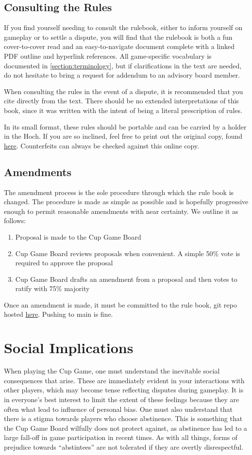 \documentclass[12pt]{IEEEconf}
\begin{document}
\subsection{Consulting the Rules}
If you find yourself needing to consult the rulebook, either to inform yourself on gameplay or to settle a dispute, you will find that the rulebook is both a fun cover-to-cover read and an easy-to-navigate document complete with a linked PDF outline and hyperlink references. All game-specific vocabulary is documented in \ref{section:terminology}, but if clarifications in the text are needed, do not hesitate to bring a request for addendum to an advisory board member.

When consulting the rules in the event of a dispute, it is recommended that you cite directly from the text. There should be no extended interpretations of this book, since it was written with the intent of being a literal prescription of rules.

In its small format, these rules should be portable and can be carried by a holder in the Hoch. If you are so inclined, feel free to print out the original copy, found \href{https://www.cs.hmc.edu/~hpick/Cupgame%20Rules.pdf}{here}. Counterfeits can always be checked against this online copy.
\subsection{Amendments}
The amendment process is the sole procedure through which the rule book is changed. The procedure is made as simple as possible and is hopefully progressive enough to permit reasonable amendments with near certainty. We outline it as follows:
\begin{enumerate}
    \item Proposal is made to the Cup Game Board
    \item Cup Game Board reviews proposals when convenient. A simple 50\% vote is required to approve the proposal
    \item Cup Game Board drafts an amendment from a proposal and then votes to ratify with 75\% majority
\end{enumerate}
Once an amendment is made, it must be committed to the rule book, git repo hosted \href{https://github.com/henry-2025/Cupgame-Rules}{here}. Pushing to main is fine.
\section{Social Implications}
\label{section:social}
When playing the Cup Game, one must understand the inevitable social consequences that arise. These are immediately evident in your interactions with other players, which may become tense reflecting disputes during gameplay. It is in everyone's best interest to limit the extent of these feelings because they are often what lead to influence of personal bias. One must also understand that there is a stigma towards players who choose abstinence. This is something that the Cup Game Board wilfully does not protect against, as abstinence has led to a large fall-off in game participation in recent times. As with all things, forms of prejudice towards ``abstintees'' are not tolerated if they are overtly disrespectful.
\end{document}
